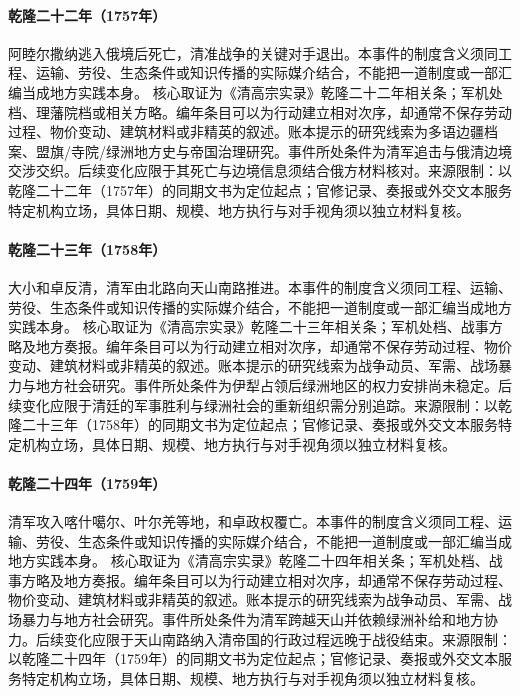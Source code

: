 \hypertarget{civic:EQ-1757-AMURSANA-DEATH}{}\paragraph{乾隆二十二年（1757年）}阿睦尔撒纳逃入俄境后死亡，清准战争的关键对手退出。本事件的制度含义须同工程、运输、劳役、生态条件或知识传播的实际媒介结合，不能把一道制度或一部汇编当成地方实践本身。 核心取证为《清高宗实录》乾隆二十二年相关条；军机处档、理藩院档或相关方略。编年条目可以为行动建立相对次序，却通常不保存劳动过程、物价变动、建筑材料或非精英的叙述。账本提示的研究线索为多语边疆档案、盟旗/寺院/绿洲地方史与帝国治理研究。事件所处条件为清军追击与俄清边境交涉交织。后续变化应限于其死亡与边境信息须结合俄方材料核对。来源限制：以乾隆二十二年（1757年）的同期文书为定位起点；官修记录、奏报或外交文本服务特定机构立场，具体日期、规模、地方执行与对手视角须以独立材料复核。
\hypertarget{civic:EQ-1758-KHOJA-REBELLION}{}\paragraph{乾隆二十三年（1758年）}大小和卓反清，清军由北路向天山南路推进。本事件的制度含义须同工程、运输、劳役、生态条件或知识传播的实际媒介结合，不能把一道制度或一部汇编当成地方实践本身。 核心取证为《清高宗实录》乾隆二十三年相关条；军机处档、战事方略及地方奏报。编年条目可以为行动建立相对次序，却通常不保存劳动过程、物价变动、建筑材料或非精英的叙述。账本提示的研究线索为战争动员、军需、战场暴力与地方社会研究。事件所处条件为伊犁占领后绿洲地区的权力安排尚未稳定。后续变化应限于清廷的军事胜利与绿洲社会的重新组织需分别追踪。来源限制：以乾隆二十三年（1758年）的同期文书为定位起点；官修记录、奏报或外交文本服务特定机构立场，具体日期、规模、地方执行与对手视角须以独立材料复核。
\hypertarget{civic:EQ-1759-KASHGAR-YARKAND-CAMPAIGN}{}\paragraph{乾隆二十四年（1759年）}清军攻入喀什噶尔、叶尔羌等地，和卓政权覆亡。本事件的制度含义须同工程、运输、劳役、生态条件或知识传播的实际媒介结合，不能把一道制度或一部汇编当成地方实践本身。 核心取证为《清高宗实录》乾隆二十四年相关条；军机处档、战事方略及地方奏报。编年条目可以为行动建立相对次序，却通常不保存劳动过程、物价变动、建筑材料或非精英的叙述。账本提示的研究线索为战争动员、军需、战场暴力与地方社会研究。事件所处条件为清军跨越天山并依赖绿洲补给和地方协力。后续变化应限于天山南路纳入清帝国的行政过程远晚于战役结束。来源限制：以乾隆二十四年（1759年）的同期文书为定位起点；官修记录、奏报或外交文本服务特定机构立场，具体日期、规模、地方执行与对手视角须以独立材料复核。
